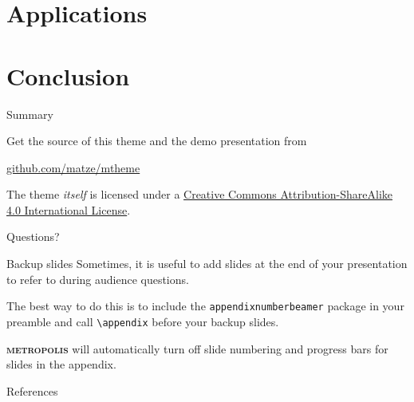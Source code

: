 \documentclass[10pt]{beamer}
\newcommand{\themename}{\textbf{\textsc{metropolis}}\xspace}
\begin{document}
\section{Applications}


\section{Conclusion}

\begin{frame}{Summary}

  Get the source of this theme and the demo presentation from

  \begin{center}\url{github.com/matze/mtheme}\end{center}

  The theme \emph{itself} is licensed under a
  \href{http://creativecommons.org/licenses/by-sa/4.0/}{Creative Commons
  Attribution-ShareAlike 4.0 International License}.

  \begin{center}\ccbysa\end{center}

\end{frame}

{
\begin{frame}[standout]
  Questions?
\end{frame}
}

\appendix

\begin{frame}[fragile]{Backup slides}
  Sometimes, it is useful to add slides at the end of your presentation to
  refer to during audience questions.

  The best way to do this is to include the \verb|appendixnumberbeamer|
  package in your preamble and call \verb|\appendix| before your backup slides.

  \themename will automatically turn off slide numbering and progress bars for
  slides in the appendix.
\end{frame}

\begin{frame}[allowframebreaks]{References}

  
  

\end{frame}
\end{document}

